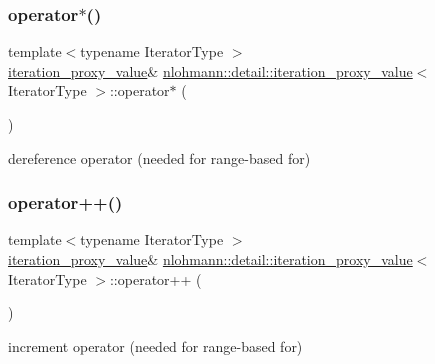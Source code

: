 \subsubsection{\texorpdfstring{operator$\ast$()}{operator*()}}
{\footnotesize\ttfamily template$<$typename Iterator\+Type $>$ \\
\hyperlink{classnlohmann_1_1detail_1_1iteration__proxy__value}{iteration\+\_\+proxy\+\_\+value}\& \hyperlink{classnlohmann_1_1detail_1_1iteration__proxy__value}{nlohmann\+::detail\+::iteration\+\_\+proxy\+\_\+value}$<$ Iterator\+Type $>$\+::operator$\ast$ (\begin{DoxyParamCaption}{ }\end{DoxyParamCaption})\hspace{0.3cm}{\ttfamily [inline]}}



dereference operator (needed for range-\/based for) 

\mbox{\label{classnlohmann_1_1detail_1_1iteration__proxy__value_adf4db2aef31822f3a179435158a4de11}} 
\subsubsection{\texorpdfstring{operator++()}{operator++()}}
{\footnotesize\ttfamily template$<$typename Iterator\+Type $>$ \\
\hyperlink{classnlohmann_1_1detail_1_1iteration__proxy__value}{iteration\+\_\+proxy\+\_\+value}\& \hyperlink{classnlohmann_1_1detail_1_1iteration__proxy__value}{nlohmann\+::detail\+::iteration\+\_\+proxy\+\_\+value}$<$ Iterator\+Type $>$\+::operator++ (\begin{DoxyParamCaption}{ }\end{DoxyParamCaption})\hspace{0.3cm}{\ttfamily [inline]}}



increment operator (needed for range-\/based for) 

\mbox{\label{classnlohmann_1_1detail_1_1iteration__proxy__value_af2b78a8b9c9276b07c928b21bb1e2d54}} 
